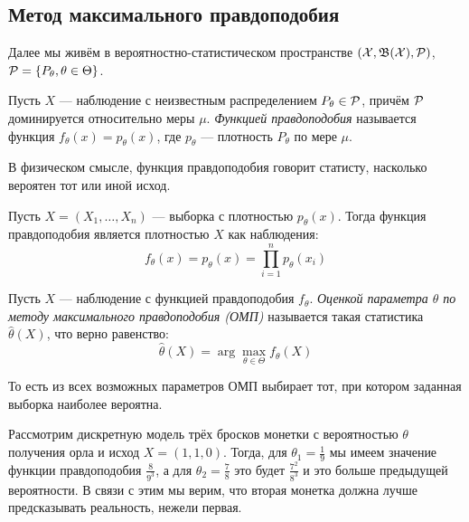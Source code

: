 \subsection{Метод максимального правдоподобия}

\begin{note}
	Далее мы живём в вероятностно-статистическом пространстве $(\mathcal{X}, \mathfrak{B}(\mathcal{X}), \mathcal{P})$, $\mathcal{P} = \{P_\theta, \theta \in \Theta\}$.
\end{note}

\begin{definition}
	Пусть $X$ --- наблюдение с неизвестным распределением $P_\theta \in \mathcal{P}$, причём $\mathcal{P}$ доминируется относительно меры $\mu$. \textit{Функцией правдоподобия} называется функция $f_\theta(x) = p_\theta(x)$, где $p_\theta$ --- плотность $P_\theta$ по мере $\mu$.
\end{definition}

\begin{anote}
	В физическом смысле, функция правдоподобия говорит статисту, насколько вероятен тот или иной исход.
\end{anote}

\begin{example}
	Пусть $X = (X_1, \ldots, X_n)$ --- выборка с плотностью $p_\theta(x)$. Тогда функция правдоподобия является плотностью $X$ как наблюдения:
	\[
		f_\theta(x) = p_\theta(x) = \prod_{i = 1}^n p_\theta(x_i)
	\]
\end{example}

\begin{definition}
	Пусть $X$ --- наблюдение с функцией правдоподобия $f_\theta$. \textit{Оценкой параметра $\theta$ по методу максимального правдоподобия (ОМП)} называется такая статистика $\hat{\theta}(X)$, что верно равенство:
	\[
		\hat{\theta}(X) = \arg\max_{\theta \in \Theta} f_\theta(X)
	\]
\end{definition}

\begin{anote}
	То есть из всех возможных параметров ОМП выбирает тот, при котором заданная выборка наиболее вероятна.
\end{anote}

\begin{example}
	Рассмотрим дискретную модель трёх бросков монетки с вероятностью $\theta$ получения орла и исход $X = (1, 1, 0)$. Тогда, для $\theta_1 = \frac{1}{9}$ мы имеем значение функции правдоподобия $\frac{8}{9^3}$, а для $\theta_2 = \frac{7}{8}$ это будет $\frac{7^2}{8^3}$ и это больше предыдущей вероятности. В связи с этим мы верим, что вторая монетка должна лучше предсказывать реальность, нежели первая.
\end{example}

